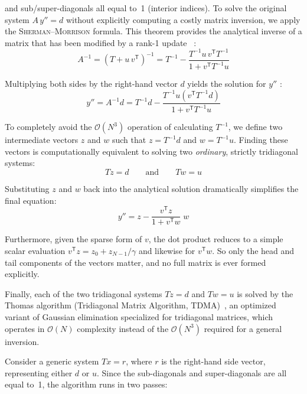 \documentclass{tropLaClasse}
\begin{document}
and sub/super-diagonals all equal to~1 (interior indices). To solve the original system $A\,y'' = d$ without explicitly computing a costly matrix inversion, we apply the \textsc{Sherman--Morrison} formula. This theorem provides the analytical inverse of a matrix that has been modified by a rank-1 update~\cite{numerical_recipes} :
\begin{equation}
    A^{-1} = (T + u\,v^{\mathsf{T}})^{-1} = T^{-1} - \frac{T^{-1} u\,v^{\mathsf{T}} T^{-1}}{1 + v^{\mathsf{T}} T^{-1} u}
\end{equation}

Multiplying both sides by the right-hand vector $d$ yields the solution for $y''$ :
\begin{equation}
    y'' = A^{-1} d = T^{-1} d - \frac{T^{-1} u \left(v^{\mathsf{T}} T^{-1} d\right)}{1 + v^{\mathsf{T}} T^{-1} u}
\end{equation}

To completely avoid the $\mathcal{O}(N^3)$ operation of calculating $T^{-1}$, we define two intermediate vectors $z$ and $w$ such that $z = T^{-1} d$ and $w = T^{-1} u$. Finding these vectors is computationally equivalent to solving two \emph{ordinary}, strictly tridiagonal systems:
\begin{equation}
    T z = d \qquad \text{and} \qquad T w = u
\end{equation}

Substituting $z$ and $w$ back into the analytical solution dramatically simplifies the final equation:
\begin{equation}
    y'' = z - \frac{v^{\mathsf{T}} z}{1 + v^{\mathsf{T}} w}\; w
    \label{eq:sherman-morrison-solution}
\end{equation}

Furthermore, given the sparse form of $v$, the dot product reduces to a simple scalar evaluation $v^{\mathsf{T}} z = z_0 + z_{N-1}/\gamma$ and likewise for $v^{\mathsf{T}} w$. So only the head and tail components of the vectors matter, and no full matrix is ever formed explicitly.

Finally, each of the two tridiagonal systems $T z = d$ and $T w = u$ is solved by the Thomas algorithm (Tridiagonal Matrix Algorithm, TDMA)~\cite{burden_faires}, an optimized variant of Gaussian elimination specialized for tridiagonal matrices, which operates in $\mathcal{O}(N)$ complexity instead of the $\mathcal{O}(N^3)$ required for a general inversion.

Consider a generic system $T x = r$, where $r$ is the right-hand side vector, representing either $d$ or $u$. Since the sub-diagonals and super-diagonals are all equal to~1, the algorithm runs in two passes:
\end{document}
